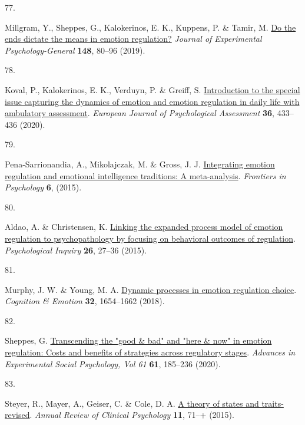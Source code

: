 \documentclass[
  man,floatsintext]{apa6}
\newlength{\cslhangindent}
\newlength{\csllabelwidth}
\newlength{\cslentryspacingunit} %
\newenvironment{CSLReferences}[2] %
 {%
  \setlength{\parindent}{0pt}
  \ifodd #1
  \let\oldpar\par
  \def\par{\hangindent=\cslhangindent\oldpar}
  \fi
  \setlength{\parskip}{#2\cslentryspacingunit}
 }%
 {}
\newcommand{\CSLLeftMargin}[1]{\parbox[t]{\csllabelwidth}{#1}}
\newcommand{\CSLRightInline}[1]{\parbox[t]{\linewidth - \csllabelwidth}{#1}\break}
\begin{document}
\begin{CSLReferences}{0}{0}
\leavevmode{}%
\CSLLeftMargin{77. }%
\CSLRightInline{Millgram, Y., Sheppes, G., Kalokerinos, E. K., Kuppens, P. \& Tamir, M. \href{https://doi.org/10.1037/xge0000477}{Do the ends dictate the means in emotion regulation?} \emph{Journal of Experimental Psychology-General} \textbf{148}, 80--96 (2019).}

\leavevmode{}%
\CSLLeftMargin{78. }%
\CSLRightInline{Koval, P., Kalokerinos, E. K., Verduyn, P. \& Greiff, S. \href{https://doi.org/10.1027/1015-5759/a000599}{Introduction to the special issue capturing the dynamics of emotion and emotion regulation in daily life with ambulatory assessment}. \emph{European Journal of Psychological Assessment} \textbf{36}, 433--436 (2020).}

\leavevmode{}%
\CSLLeftMargin{79. }%
\CSLRightInline{Pena-Sarrionandia, A., Mikolajczak, M. \& Gross, J. J. \href{https://doi.org/ARTN\%20160\%0A10.3389/fpsyg.2015.00160}{Integrating emotion regulation and emotional intelligence traditions: A meta-analysis}. \emph{Frontiers in Psychology} \textbf{6}, (2015).}

\leavevmode{}%
\CSLLeftMargin{80. }%
\CSLRightInline{Aldao, A. \& Christensen, K. \href{https://doi.org/10.1080/1047840x.2015.962399}{Linking the expanded process model of emotion regulation to psychopathology by focusing on behavioral outcomes of regulation}. \emph{Psychological Inquiry} \textbf{26}, 27--36 (2015).}

\leavevmode{}%
\CSLLeftMargin{81. }%
\CSLRightInline{Murphy, J. W. \& Young, M. A. \href{https://doi.org/10.1080/02699931.2017.1419935}{Dynamic processes in emotion regulation choice}. \emph{Cognition \& Emotion} \textbf{32}, 1654--1662 (2018).}

\leavevmode{}%
\CSLLeftMargin{82. }%
\CSLRightInline{Sheppes, G. \href{https://doi.org/10.1016/bs.aesp.2019.09.003}{Transcending the "good \& bad" and "here \& now" in emotion regulation: Costs and benefits of strategies across regulatory stages}. \emph{Advances in Experimental Social Psychology, Vol 61} \textbf{61}, 185--236 (2020).}

\leavevmode{}%
\CSLLeftMargin{83. }%
\CSLRightInline{Steyer, R., Mayer, A., Geiser, C. \& Cole, D. A. \href{https://doi.org/10.1146/annurev-clinpsy-032813-153719}{A theory of states and traits-revised}. \emph{Annual Review of Clinical Psychology} \textbf{11}, 71--+ (2015).}


\end{CSLReferences}
\end{document}
